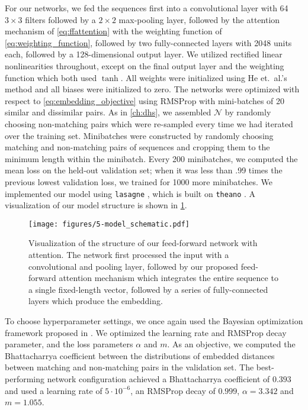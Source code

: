 For our networks, we fed the sequences first into a convolutional layer with 64 $3 \times 3$ filters followed by a $2 \times 2$ max-pooling layer, followed by the attention mechanism of \cref{eq:ffattention} with the weighting function of \cref{eq:weighting_function}, followed by two fully-connected layers with 2048 units each, followed by a 128-dimensional output layer.
We utilized rectified linear nonlinearities throughout, except on the final output layer and the weighting function which both used $\tanh$.
All weights were initialized using He et.\ al.'s method \cite{he2015delving} and all biases were initialized to zero.
The networks were optimized with respect to \cref{eq:embedding_objective} using RMSProp with mini-batches of 20 similar and dissimilar pairs.
As in \cref{ch:dhs}, we assembled $\mathcal{N}$ by randomly choosing non-matching pairs which were re-sampled every time we had iterated over the training set.
Minibatches were constructed by randomly choosing matching and non-matching pairs of sequences and cropping them to the minimum length within the minibatch.
Every 200 minibatches, we computed the mean loss on the held-out validation set; when it was less than .99 times the previous lowest validation loss, we trained for 1000 more minibatches.
We implemented our model using \texttt{lasagne} \cite{dieleman2015lasagne}, which is built on \texttt{theano} \cite{bergstra2010theano, bastien2012theano}.
A visualization of our model structure is shown in \cref{fig:model_schematic}.

\begin{figure}
  \texttt{[image: figures/5-model\_schematic.pdf]}
  \caption[Structure of our feed-forward attention network]{Visualization of the structure of our feed-forward network with attention.
The network first processed the input with a convolutional and pooling layer, followed by our proposed feed-forward attention mechanism which integrates the entire sequence to a single fixed-length vector, followed by a series of fully-connected layers which produce the embedding.}
  \label{fig:model_schematic}
\end{figure}

To choose hyperparameter settings, we once again used the Bayesian optimization framework proposed in \cite{snoek2012practical}.
We optimized the learning rate and RMSProp decay parameter, and the loss parameters $\alpha$ and $m$.
As an objective, we computed the Bhattacharrya coefficient \cite{bhattacharyya1943measure} between the distributions of embedded distances between matching and non-matching pairs in the validation set.
The best-performing network configuration achieved a Bhattacharrya coefficient of $0.393$ and used a learning rate of $5\cdot10^{-6}$, an RMSProp decay of $0.999$, $\alpha = 3.342$ and $m = 1.055$.

